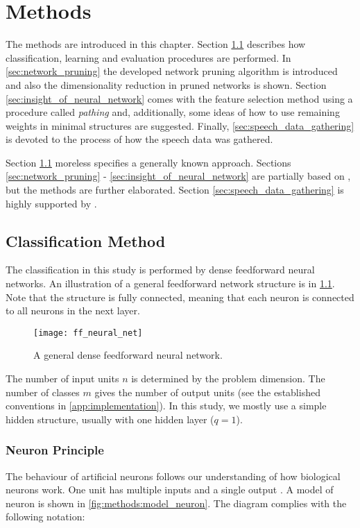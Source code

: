 \chapter{Methods} \label{chap:methods}
The methods are introduced in this chapter. Section \ref{sec:classification_method} describes how classification, learning and evaluation procedures are performed. In \cref{sec:network_pruning} the developed network pruning algorithm is introduced and also the dimensionality reduction in pruned networks is shown. Section \ref{sec:insight_of_neural_network} comes with the feature selection method using a procedure called \textit{pathing} and, additionally, some ideas of how to use remaining weights in minimal structures are suggested. Finally, \cref{sec:speech_data_gathering} is devoted to the process of how the speech data was gathered.

Section \ref{sec:classification_method} moreless specifies a generally known approach. Sections \ref{sec:network_pruning} - \ref{sec:insight_of_neural_network} are partially based on \citep{bulin_2016}, but the methods are further elaborated. Section \ref{sec:speech_data_gathering} is highly supported by \citep{smidl_pc}.

\section{Classification Method} \label{sec:classification_method}
The classification in this study is performed by dense feedforward neural networks. An illustration of a general feedforward network structure is in \cref{fig:methods:ff_neural_net}. Note that the structure is fully connected, meaning that each neuron is connected to all neurons in the next layer.

\begin{figure}[H]
\centering
\texttt{[image: ff\_neural\_net]}
\caption{A general dense feedforward neural network.}
\label{fig:methods:ff_neural_net}
\end{figure}

The number of input units $ n $ is determined by the problem dimension. The number of classes $ m $ gives the number of output units (see the established conventions in \cref{app:implementation}). In this study, we mostly use a simple hidden structure, usually with one hidden layer ($ q = 1 $).

\subsection*{Neuron Principle}
The behaviour of artificial neurons follows our understanding of how biological neurons work. One unit has multiple inputs and a single output \citep{article:perceptron}. A model of neuron is shown in \cref{fig:methods:model_neuron}. The diagram complies with the following notation:

